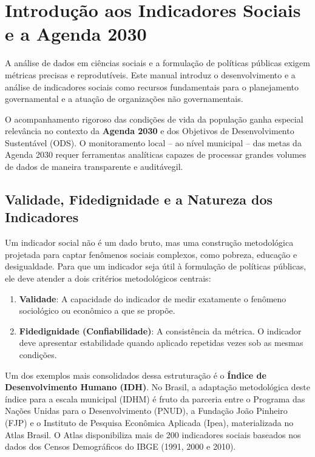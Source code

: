 \documentclass[
  brazilian,
  11pt,
  a4paper,
  open = right,
  twoside = true]{scrbook}
\providecommand{\tightlist}{%
  \setlength{\itemsep}{0pt}\setlength{\parskip}{0pt}}
\begin{document}
\chapter{Introdução aos Indicadores Sociais e a Agenda
2030}\label{introduuxe7uxe3o-aos-indicadores-sociais-e-a-agenda-2030}

A análise de dados em ciências sociais e a formulação de políticas
públicas exigem métricas precisas e reprodutíveis. Este manual introduz
o desenvolvimento e a análise de indicadores sociais como recursos
fundamentais para o planejamento governamental e a atuação de
organizações não governamentais.

O acompanhamento rigoroso das condições de vida da população ganha
especial relevância no contexto da \textbf{Agenda 2030} e dos Objetivos
de Desenvolvimento Sustentável (ODS). O monitoramento local -- ao nível
municipal -- das metas da Agenda 2030 requer ferramentas analíticas
capazes de processar grandes volumes de dados de maneira transparente e
auditávegil.

\section{Validade, Fidedignidade e a Natureza dos
Indicadores}\label{validade-fidedignidade-e-a-natureza-dos-indicadores}

Um indicador social não é um dado bruto, mas uma construção metodológica
projetada para captar fenômenos sociais complexos, como pobreza,
educação e desigualdade. Para que um indicador seja útil à formulação de
políticas públicas, ele deve atender a dois critérios metodológicos
centrais:

\begin{enumerate}
\def\labelenumi{\arabic{enumi}.}
\tightlist
\item
  \textbf{Validade}: A capacidade do indicador de medir exatamente o
  fenômeno sociológico ou econômico a que se propõe.
\item
  \textbf{Fidedignidade (Confiabilidade)}: A consistência da métrica. O
  indicador deve apresentar estabilidade quando aplicado repetidas vezes
  sob as mesmas condições.
\end{enumerate}

Um dos exemplos mais consolidados dessa estruturação é o \textbf{Índice
de Desenvolvimento Humano (IDH)}. No Brasil, a adaptação metodológica
deste índice para a escala municipal (IDHM) é fruto da parceria entre o
Programa das Nações Unidas para o Desenvolvimento (PNUD), a Fundação
João Pinheiro (FJP) e o Instituto de Pesquisa Econômica Aplicada (Ipea),
materializada no Atlas Brasil. O Atlas disponibiliza mais de 200
indicadores sociais baseados nos dados dos Censos Demográficos do IBGE
(1991, 2000 e 2010).
\end{document}
